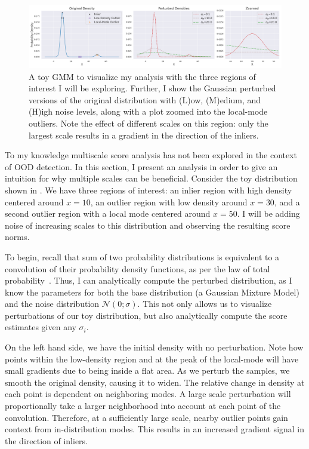 \begin{figure}[tbhp]
\label{fig:toy_gmm}
\centering
\includegraphics[width=\linewidth]{figures/gmm_plot_tight.png}
\caption{A toy GMM to visualize my analysis with the three regions of interest I will be exploring. Further, I show the Gaussian perturbed versions of the original distribution with (L)ow, (M)edium, and (H)igh noise levels, along with a plot zoomed into the local-mode outliers. Note the effect of different scales on this region: only the largest scale results in a gradient in the direction of the inliers.}
\end{figure}

To my knowledge multiscale score analysis has not been explored in the context of OOD detection. In this section, I present an analysis in order to give an intuition for why multiple scales can be beneficial. Consider the toy distribution shown in . We have three regions of interest: an inlier region with high density centered around $x=10$, an outlier region with low density around $x=30$, and a second outlier region with a local mode centered around $x=50$. I will be adding noise of increasing scales to this distribution and observing the resulting score norms.

To begin, recall that sum of two probability distributions is equivalent to a convolution of their probability density functions, as per the law of total probability~\cite{sumisconv}. Thus, I can analytically compute the perturbed distribution, as I know the parameters for both the base distribution (a Gaussian Mixture Model) and the noise distribution $\mathcal{N}(0; \sigma)$. This not only allows us to visualize perturbations of our toy distribution, but also analytically compute the score estimates given any $\sigma_i$.

On the left hand side, we have the initial density with no perturbation. Note how points within the low-density region and at the peak of the local-mode will have small gradients due to being inside a flat area. As we perturb the samples, we smooth the original density, causing it to widen. The relative change in density at each point is dependent on neighboring modes. A large scale perturbation will proportionally take a larger neighborhood into account at each point of the convolution. Therefore, at a sufficiently large scale, nearby outlier points gain context from in-distribution modes. This results in an increased gradient signal in the direction of inliers. 

